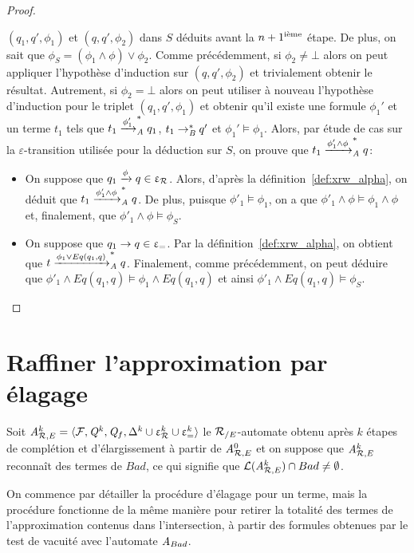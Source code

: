\begin{proof}
\begin{itemize}
\begin{itemize}
    $(q_1,q',\phi_1)$ et $(q,q',\phi_2)$ dans $S$ déduits avant la $n+1^\iem$
    étape. De plus, on sait que $\phi_S=(\phi_1 \wedge \phi) \vee \phi_2$.
    Comme précédemment, si $\phi_2 \neq \bot$ alors on peut appliquer l'hypothèse d'induction
    sur $(q,q',\phi_2)$ et trivialement obtenir le résultat. Autrement, si $\phi_2=\bot$
    alors on peut utiliser à nouveau l'hypothèse d'induction pour le triplet $(q_1,q',\phi_1)$ et
    obtenir qu'il existe une formule $\phi_1'$ et un terme $t_1$ tels que
    $t_1\xrw{\phi_1'}_\A^* q_1$, $t_1 \rwB^* q'$ et $\phi_1' \models \phi_1$.
    Alors, par étude de cas sur la  $\varepsilon$-transition utilisée pour la déduction sur $S$, on 
    prouve que $t_1 \xrw{\phi_1'\wedge \phi}_\A^* q$:

    \begin{itemize}
    \item On suppose que $q_1 \xrw{\phi} q \in \Drw$. Alors, d'après la
      définition~\ref{def:xrw_alpha}, on déduit que $t_1 \xrw{\phi'_1
        \wedge \phi}_\A^* q$. De plus, puisque $\phi'_1 \models \phi_1$, on a que
      $\phi'_1 \wedge \phi \models \phi_1 \wedge \phi$ et, finalement, que
      $\phi'_1 \wedge \phi \models \phi_S$.

    \item On suppose que $q_1 \rw q \in \Deq$. Par
      la définition~\ref{def:xrw_alpha}, on obtient que $t \xrw{\phi_1 \lor Eq(q_1, q)}_\A^* q$.
      Finalement, comme précédemment, on peut déduire que
      $\phi'_1 \wedge Eq(q_1,q) \models \phi_1 \wedge Eq(q_1,q)$ et ainsi $\phi'_1 \wedge
      Eq(q_1,q) \models \phi_S$.
    \end{itemize}
  \end{itemize}
\end{itemize}
\end{proof}


\section{Raffiner l'approximation par élagage}
\label{sec:refinement}


Soit $\aaexeq^k = \la \F, \Q^k, \Q_f, \Delta^k \cup \Drw^k \cup \Deq^k
\ra$ le $\RE$-automate obtenu après $k$ étapes de complétion et d'élargissement
à partir de $\aaexeq^0$ et on suppose que $\aaexeq^k$ reconnaît des termes de $Bad$,
ce qui signifie que $\Lang(\aaexeq^k) \cap Bad \not=\emptyset$. 

On commence par détailler la procédure d'élagage pour un terme, 
mais la procédure fonctionne de la même manière pour retirer la totalité 
des termes de l'approximation contenus dans l'intersection, à partir des
formules obtenues par le test de vacuité avec l'automate $\A_{Bad}$.


